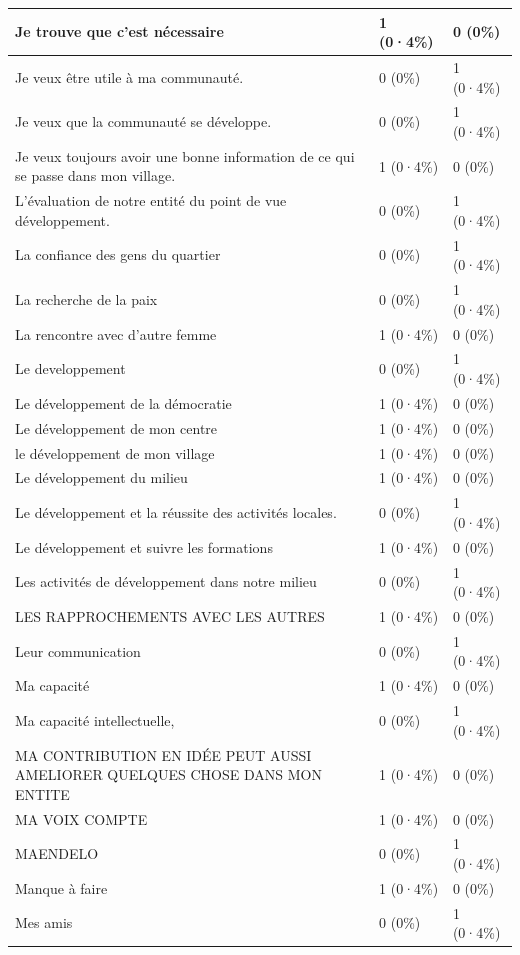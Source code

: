 \documentclass[
]{book}
\begin{document}
\begin{tabular}{l|l|l}
\hline
Je trouve que c'est nécessaire & 1 (0·4\%) & 0 (0\%)\\
\hline
Je veux être utile à ma communauté. & 0 (0\%) & 1 (0·4\%)\\
\hline
Je veux que la communauté se développe. & 0 (0\%) & 1 (0·4\%)\\
\hline
Je veux toujours avoir une bonne information de ce qui se passe dans mon village. & 1 (0·4\%) & 0 (0\%)\\
\hline
L'évaluation de notre entité du point de vue développement. & 0 (0\%) & 1 (0·4\%)\\
\hline
La confiance des gens du quartier & 0 (0\%) & 1 (0·4\%)\\
\hline
La recherche de la paix & 0 (0\%) & 1 (0·4\%)\\
\hline
La rencontre avec d'autre femme & 1 (0·4\%) & 0 (0\%)\\
\hline
Le developpement & 0 (0\%) & 1 (0·4\%)\\
\hline
Le développement de la démocratie & 1 (0·4\%) & 0 (0\%)\\
\hline
Le développement de mon centre & 1 (0·4\%) & 0 (0\%)\\
\hline
le développement de mon village & 1 (0·4\%) & 0 (0\%)\\
\hline
Le développement du milieu & 1 (0·4\%) & 0 (0\%)\\
\hline
Le développement et la réussite des activités locales. & 0 (0\%) & 1 (0·4\%)\\
\hline
Le développement et suivre les formations & 1 (0·4\%) & 0 (0\%)\\
\hline
Les activités de développement dans notre milieu & 0 (0\%) & 1 (0·4\%)\\
\hline
LES RAPPROCHEMENTS AVEC LES AUTRES & 1 (0·4\%) & 0 (0\%)\\
\hline
Leur communication & 0 (0\%) & 1 (0·4\%)\\
\hline
Ma capacité & 1 (0·4\%) & 0 (0\%)\\
\hline
Ma capacité intellectuelle, & 0 (0\%) & 1 (0·4\%)\\
\hline
MA CONTRIBUTION EN IDÉE PEUT AUSSI AMELIORER QUELQUES CHOSE DANS MON ENTITE & 1 (0·4\%) & 0 (0\%)\\
\hline
MA VOIX COMPTE & 1 (0·4\%) & 0 (0\%)\\
\hline
MAENDELO & 0 (0\%) & 1 (0·4\%)\\
\hline
Manque à faire & 1 (0·4\%) & 0 (0\%)\\
\hline
Mes amis & 0 (0\%) & 1 (0·4\%)\\

\end{tabular}
\end{document}
